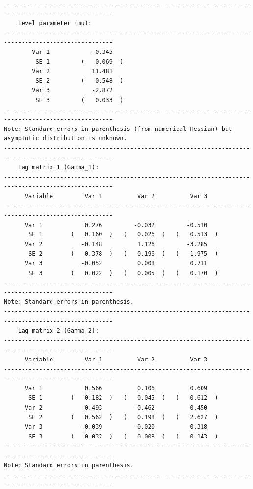 \documentclass[10pt]{article}
\begin{document}
\begin{verbatim}
-----------------------------------------------------------------------------------------------------
    Level parameter (mu):                                                                         
-----------------------------------------------------------------------------------------------------
        Var 1            -0.345     
         SE 1         (   0.069  )  
        Var 2            11.481     
         SE 2         (   0.548  )  
        Var 3            -2.872     
         SE 3         (   0.033  )  
-----------------------------------------------------------------------------------------------------
Note: Standard errors in parenthesis (from numerical Hessian) but asymptotic distribution is unknown. 
-----------------------------------------------------------------------------------------------------
    Lag matrix 1 (Gamma_1):                                                                            
-----------------------------------------------------------------------------------------------------
      Variable         Var 1          Var 2          Var 3   
-----------------------------------------------------------------------------------------------------
      Var 1            0.276         -0.032         -0.510    
       SE 1        (   0.160  )   (   0.026  )   (   0.513  )  
      Var 2           -0.148          1.126         -3.285    
       SE 2        (   0.378  )   (   0.196  )   (   1.975  )  
      Var 3           -0.052          0.008          0.711    
       SE 3        (   0.022  )   (   0.005  )   (   0.170  )  
-----------------------------------------------------------------------------------------------------
Note: Standard errors in parenthesis.                                                                
-----------------------------------------------------------------------------------------------------
    Lag matrix 2 (Gamma_2):                                                                            
-----------------------------------------------------------------------------------------------------
      Variable         Var 1          Var 2          Var 3   
-----------------------------------------------------------------------------------------------------
      Var 1            0.566          0.106          0.609    
       SE 1        (   0.182  )   (   0.045  )   (   0.612  )  
      Var 2            0.493         -0.462          0.450    
       SE 2        (   0.562  )   (   0.198  )   (   2.627  )  
      Var 3           -0.039         -0.020          0.318    
       SE 3        (   0.032  )   (   0.008  )   (   0.143  )  
-----------------------------------------------------------------------------------------------------
Note: Standard errors in parenthesis.                                                                
-----------------------------------------------------------------------------------------------------


\end{verbatim}
\end{document}
